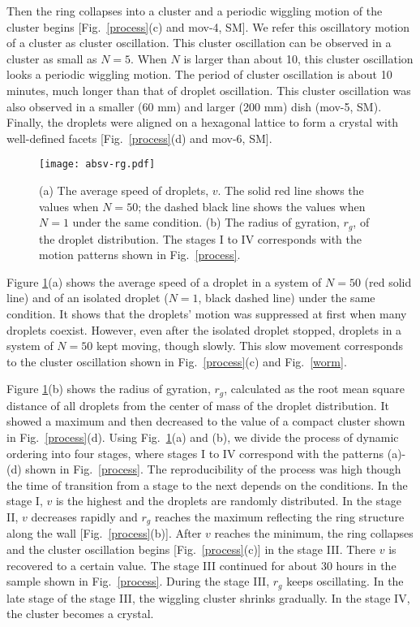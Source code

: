 \documentclass[showpacs]{revtex4-1}
\begin{document}
Then the ring collapses into a cluster and a periodic wiggling motion of
the cluster begins [Fig.~\ref{process}(c) and mov-4, SM]. We refer this
oscillatory motion of a cluster as cluster oscillation. This cluster
oscillation can be observed in a cluster as small as $N=5$. When $N$ is
larger than about 10, this cluster oscillation looks a periodic wiggling
motion. The period of cluster oscillation is about 10 minutes, much
longer than that of droplet oscillation.  This cluster oscillation was
also observed in a smaller (60 mm) and larger (200 mm) dish (mov-5,
SM). Finally, the droplets were aligned on a hexagonal lattice to form a
crystal with well-defined facets [Fig.~\ref{process}(d) and mov-6, SM].

 \begin{figure}
  \begin{center}
 \texttt{[image: absv-rg.pdf]}
 \caption{(a) The average speed of droplets, $v$. The solid red line
 shows the values when $N=50$; the dashed black line shows the values
 when $N=1$ under the same condition. (b) The radius of gyration, $r_g$,
 of the droplet distribution. The stages I to IV corresponds with the
 motion patterns shown in Fig.~\ref{process}.}  \label{absv}   
  \end{center}
 \end{figure}

Figure \ref{absv}(a) shows the average speed of a droplet in a system of
$N=50$ (red solid line) and of an isolated droplet ($N=1$, black dashed
line) under the same condition. It shows that the droplets' motion was
suppressed at first when many droplets coexist. However, even after
the isolated droplet stopped, droplets in a system of $N=50$ kept
moving, though slowly. This slow movement corresponds to the cluster
oscillation shown in Fig.~\ref{process}(c) and Fig.~\ref{worm}.

Figure \ref{absv}(b) shows the radius of gyration, $r_g$,
calculated as the root mean square distance of all droplets
from the center of mass of the droplet distribution. It showed a
maximum and then decreased to the value of a compact cluster shown in
Fig.~\ref{process}(d). Using Fig.~\ref{absv}(a) and (b), we divide the
process of dynamic ordering into four stages, where stages I to IV
correspond with the patterns (a)-(d) shown in Fig.~\ref{process}. The
reproducibility of the process was high though the time of transition
from a stage to the next depends on the conditions. In the stage I, $v$
is the highest and the droplets are randomly distributed. In the stage
II, $v$ decreases rapidly and $r_g$ reaches the maximum reflecting the
ring structure along the wall [Fig.~\ref{process}(b)]. After $v$ reaches
the minimum, the ring collapses and the cluster oscillation begins
[Fig.~\ref{process}(c)] in the stage III. There $v$ is recovered to a
certain value. The stage III continued for about 30 hours in the sample
shown in Fig.~\ref{process}. During the stage III, $r_g$ keeps
oscillating. In the late stage of the stage III, the wiggling cluster
shrinks gradually. In the stage IV, the cluster becomes a crystal.
\end{document}
